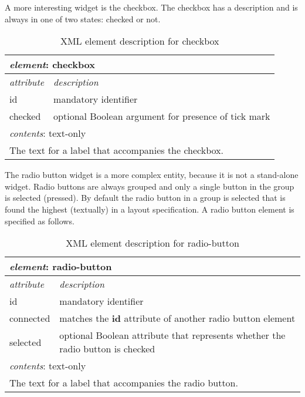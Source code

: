 \documentclass{article}
\begin{document}
    A more interesting widget is the checkbox. The checkbox has a description
    and is always in one of two states: checked or not.

    \begin{table}[H]
     \begin{center}
     \begin{tabular}{|l|l|}
       \hline
        \multicolumn{2}{|l|}{\textit{element}: checkbox} \\
       \hline \hline
        \textit{attribute} & \textit{description} \\
       \hline
        id                 & mandatory identifier \\
        checked            & optional Boolean argument for presence of tick mark \\
       \hline \hline
        \multicolumn{2}{|l|}{\textit{contents}: text-only} \\
       \hline
         \multicolumn{2}{|l|}{The text for a label that accompanies the checkbox.} \\
       \hline
     \end{tabular}
     \end{center}
     \label{figure:element_checkbox}
     \caption{XML element description for checkbox}
    \end{table}

    \noindent The radio button widget is a more complex entity, because it is
    not a stand-alone widget. Radio buttons are always grouped and only a
    single button in the group is selected (pressed).  By default the radio
    button in a group is selected that is found the highest (textually) in a
    layout specification. A radio button element is specified as follows.

    \begin{table}[H]
     \begin{center}
     \begin{tabular}{|l|l|}
       \hline
        \multicolumn{2}{|l|}{\textit{element}: radio-button} \\
       \hline \hline
        \textit{attribute} & \textit{description} \\
       \hline
        id                 & mandatory identifier \\
        connected          & matches the \textbf{id} attribute of another radio button element \\
        selected           & optional Boolean attribute that represents whether the radio button is checked \\
       \hline \hline
        \multicolumn{2}{|l|}{\textit{contents}: text-only} \\
       \hline
         \multicolumn{2}{|l|}{The text for a label that accompanies the radio button.} \\
       \hline
     \end{tabular}
     \end{center}
     \label{figure:element_radio_button}
     \caption{XML element description for radio-button}
    \end{table}
\end{document}
